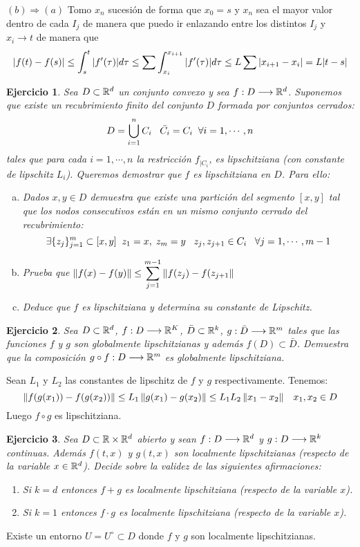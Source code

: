 \documentclass[12pt]{article}
\newtheorem{ejercicio}{Ejercicio}
\theoremstyle{definition}
\theoremstyle{remark}
\begin{document}
$(b)\Rightarrow(a)$ Tomo $x_n$ sucesión de forma que $x_0=s$ y $x_n$ sea el mayor valor dentro de cada $I_j$ de manera que puedo ir enlazando entre los distintos $I_j$ y $x_i\longrightarrow t$ de manera que 
\[
|f(t)-f(s)|\leq\displaystyle\int_{ s }^{ t } |f'(\tau)|d\tau\leq\displaystyle\sum\displaystyle\int_{ x_i }^{ x_{i+1} } |f'(\tau)|d\tau\leq L\displaystyle\sum|x_{i+1}-x_i|=L|t-s|
\]
\begin{ejercicio}
Sea $D\subset\mathbb{R}^d$ un conjunto convexo y sea $f : D \longrightarrow \mathbb{R}^d$. Suponemos que existe un recubrimiento finito del conjunto $D$ formada por conjuntos cerrados:
\[
D=\bigcup_{i=1}^nC_i \;\;\; \bar{C_i}=C_i \;\;\forall i = 1,\cdots,n
\]
tales que para cada $i=1,\cdots,n$ la restricción $f_{|C_i}$, es lipschitziana (con constante de lipschitz $L_i$). Queremos demostrar que $f$ es lipschitziana en $D$. Para ello:
\begin{enumerate}[(a)]
\item Dados $x,y\in D$ demuestra que existe una partición del segmento $[x,y]$ tal que los nodos consecutivos están en un mismo conjunto cerrado del recubrimiento:
\[
\exists\{z_j\}_{j=1}^m\subset[x,y] \;\; z_1=x, \; z_m=y \;\;\; z_j,z_{j+1}\in C_i \;\;\;\forall j=1,\cdots,m-1
\]
\item Prueba que $\left\lVert f(x)-f(y)\right\rVert\leq \displaystyle\sum_{j=1}^{m-1}\left\lVert f(z_j)-f(z_{j+1}\right\rVert$
\item Deduce que $f$ es lipschitziana y determina su constante de Lipschitz.
\end{enumerate}
\end{ejercicio}
\begin{ejercicio}
Sea $D\subset\mathbb{R}^d$, $f : D \longrightarrow \mathbb{R}^K$, $\bar{D}\subset\mathbb{R}^k$, $g : \bar{D} \longrightarrow \mathbb{R}^m$ tales que las funciones $f$ y $g$ son globalmente lipschitzianas y además $f(D)\subset\bar{D}$. Demuestra que la composición $g\circ f : D \longrightarrow \mathbb{R}^m$ es globalmente lipschitziana.
\end{ejercicio}

Sean $L_1$ y $L_2$ las constantes de lipschitz de $f$ y $g$ respectivamente. Tenemos:
\[
\left\lVert f(g(x_1))-f(g(x_2))\right\rVert\leq L_1\left\lVert g(x_1)-g(x_2)\right\rVert\leq L_1L_2\left\lVert x_1-x_2\right\rVert \;\;\; x_1,x_2\in D
\]
Luego $f\circ g$ es lipschitziana.
\begin{ejercicio}
Sea $D\subset\mathbb{R}\times\mathbb{R}^d$ abierto y sean $f : D \longrightarrow \mathbb{R}^d$ y $g : D \longrightarrow \mathbb{R}^k$ continuas. Además $f(t,x)$ y $g(t,x)$ son localmente lipschitzianas (respecto de la variable $x\in\mathbb{R}^d$). Decide sobre la validez de las siguientes afirmaciones:
\begin{enumerate}
\item Si $k=d$ entonces $f+g$ es localmente lipschitziana (respecto de la variable $x$).
\item Si $k=1$ entonces $f\cdot g$ es localmente lipschitziana (respecto de la variable $x$).
\end{enumerate}
\end{ejercicio}
Existe un entorno $U=U^\circ\subset D$ donde $f$ y $g$ son localmente lipschitzianas.
\end{document}
